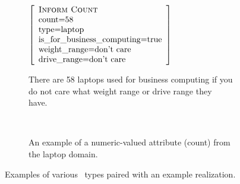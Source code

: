 \begin{figure}
~\\
~\\
~\\



\begin{subfigure}{\textwidth}
    \begin{minipage}{0.5\textwidth}
 \center
$\left[\begin{array}{l} 
    \textsc{Inform Count} \\ 
    \textrm{count=$58$} \\
    \textrm{type=laptop} \\
    \textrm{is\_for\_business\_computing=true} \\
    \textrm{weight\_range=don't care} \\
    \textrm{drive\_range=don't care} \\
\end{array}\right]$ 
\end{minipage}
\begin{minipage}{0.5\textwidth}
There are 58 laptops used for business computing if you do not care what 
weight range or drive range they have.
\end{minipage}

~\\


\caption{An example of a numeric-valued attribute (count) from the laptop domain.}
\end{subfigure}  

   
\caption{Examples of various \attributevalue~types paired with an example
realization.}
\label{fig:valtypes}
\end{figure}


